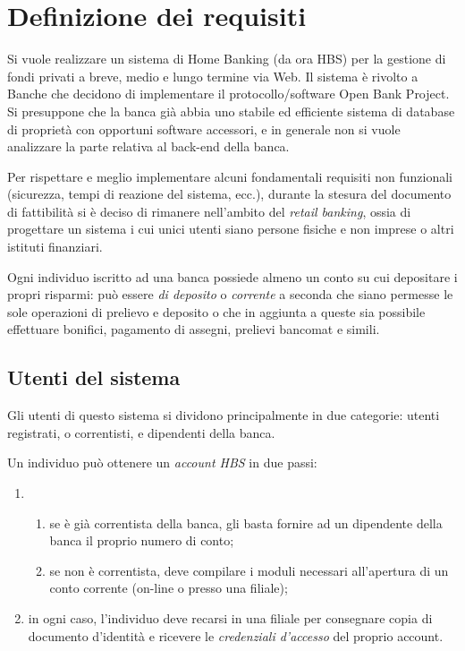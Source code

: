 \section{Definizione dei requisiti}

Si vuole realizzare un sistema di Home Banking (da ora HBS) per la gestione di fondi privati a breve, medio e lungo termine via Web. Il sistema è rivolto a Banche che decidono di implementare il protocollo/software Open Bank Project. Si presuppone che la banca già abbia uno stabile ed efficiente sistema di database di proprietà con opportuni software accessori, e in generale non si vuole analizzare la parte relativa al back-end della banca.  

Per rispettare e meglio implementare alcuni fondamentali requisiti non funzionali (sicurezza, tempi di reazione del sistema, ecc.), durante la stesura del documento di fattibilità si è deciso di rimanere nell'ambito del \emph{retail banking}, ossia di progettare un sistema i cui unici utenti siano persone fisiche e non imprese o altri istituti finanziari.

Ogni individuo iscritto ad una banca possiede almeno un conto su cui depositare i propri risparmi: può essere \emph{di deposito} o \emph{corrente} a seconda che siano permesse le sole operazioni di prelievo e deposito o che in aggiunta a queste sia possibile  effettuare bonifici, pagamento di assegni, prelievi bancomat e simili.

\subsection{Utenti del sistema}

Gli utenti di questo sistema si dividono principalmente in due categorie: utenti registrati, o correntisti, e dipendenti della banca. 

Un individuo può ottenere un \emph{account HBS} in due passi:
\begin{enumerate}
	\item
	\begin{enumerate}
		\item se è già correntista della banca, gli basta fornire ad un dipendente della banca il proprio numero di conto;
		\item se non è correntista, deve compilare i moduli necessari all'apertura di un conto corrente (on-line o presso una filiale);
	\end{enumerate}
	\item in ogni caso, l'individuo deve recarsi in una filiale per consegnare copia di documento d'identità e ricevere le 					\emph{credenziali d'accesso} del proprio account.
\end{enumerate}

